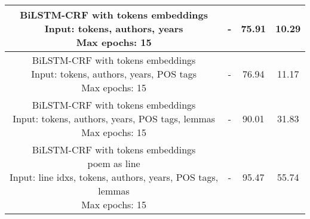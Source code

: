 \begin{table}[htpb]
\begin{tabular}{|c||c|c|c|}
    \makecell{BiLSTM-CRF with tokens embeddings\\Input: tokens, authors, years\\Max epochs: 15} & - & 75.91 & 10.29\\\hline
    \makecell{BiLSTM-CRF with tokens embeddings\\Input: tokens, authors, years, POS tags\\Max epochs: 15} & - & 76.94 & 11.17\\\hline
    \makecell{BiLSTM-CRF with tokens embeddings\\Input: tokens, authors, years, POS tags, lemmas\\Max epochs: 15} & - & 90.01 & 31.83\\\hline
    \makecell{BiLSTM-CRF with tokens embeddings\\poem as line\\Input: line idxs, tokens, authors, years, POS tags,\\lemmas\\Max epochs: 15} & - & 95.47 & 55.74\\\hline
\end{tabular}
\end{table}

